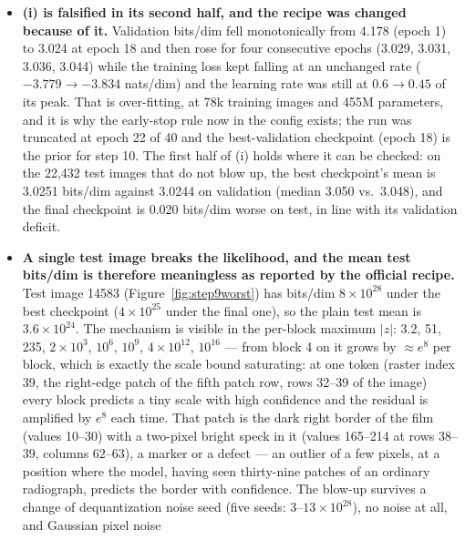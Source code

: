 \documentclass[11pt]{article}
\begin{document}
\begin{itemize}
  \item \textbf{(i) is falsified in its second half, and the recipe was
        changed because of it.} Validation bits/dim fell monotonically from
        4.178 (epoch 1) to 3.024 at epoch 18 and then rose for four
        consecutive epochs (3.029, 3.031, 3.036, 3.044) while the training
        loss kept falling at an unchanged rate ($-3.779 \to -3.834$
        nats/dim) and the learning rate was still at $0.6 \to 0.45$ of its
        peak. That is over-fitting, at 78k training images and 455M
        parameters, and it is why the early-stop rule now in the config
        exists; the run was truncated at epoch 22 of 40 and the
        best-validation checkpoint (epoch 18) is the prior for step 10. The
        first half of (i) holds where it can be checked: on the 22,432 test
        images that do not blow up, the best checkpoint's mean is 3.0251
        bits/dim against 3.0244 on validation (median 3.050 vs.\ 3.048), and
        the final checkpoint is 0.020 bits/dim worse on test, in line with
        its validation deficit.
  \item \textbf{A single test image breaks the likelihood, and the mean
        test bits/dim is therefore meaningless as reported by the official
        recipe.} Test image 14583 (Figure~\ref{fig:step9worst}) has bits/dim
        $8 \times 10^{28}$ under the best checkpoint ($4 \times 10^{25}$
        under the final one), so the plain test mean is $3.6 \times
        10^{24}$. The mechanism is visible in the per-block maximum $|z|$:
        3.2, 51, 235, $2 \times 10^{3}$, $10^{6}$, $10^{9}$, $4 \times
        10^{12}$, $10^{16}$ --- from block 4 on it grows by $\approx e^{8}$
        per block, which is exactly the scale bound saturating: at one
        token (raster index 39, the right-edge patch of the fifth patch
        row, rows 32--39 of the image) every block predicts a tiny scale
        with high confidence and the residual is amplified by $e^{8}$ each
        time. That patch is the dark right border of the film (values
        10--30) with a two-pixel bright speck in it (values 165--214 at
        rows 38--39, columns 62--63), a marker or a defect --- an outlier
        of a few pixels, at a position where the model, having seen
        thirty-nine patches of an ordinary radiograph, predicts the border
        with confidence. The
        blow-up survives a change of dequantization noise seed (five seeds:
        $3$--$13 \times 10^{28}$), no noise at all, and Gaussian pixel noise

\end{itemize}
\end{document}
